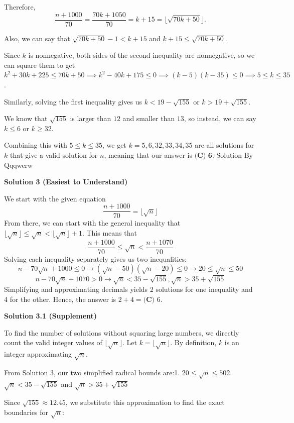 \begin{enumerate}
 Therefore, 
 \[\frac{n+1000}{70}=\frac{70k+1050}{70}=k+15=\lfloor\sqrt{70k+50}\rfloor.\]

 Also, we can say that $\sqrt{70k+50}-1 < k+15$ and $k+15\leq\sqrt{70k+50}.$

 Since $k$ is nonnegative, both sides of the second inequality are nonnegative, so we can square them to get $k^{2}+30k+225\leq70k+50\implies k^{2}-40k+175\leq 0\implies (k-5)(k-35)\leq0\implies 5\leq k\leq 35$.

 Similarly, solving the first inequality gives us $k < 19-\sqrt{155}$ or $k > 19+\sqrt{155}.$

 We know that $\sqrt{155}$ is larger than $12$ and smaller than $13$, so instead, we can say $k\leq 6$ or $k\geq 32$.

 Combining this with $5\leq k\leq 35$, we get $k=5,6,32,33,34,35$ are all solutions for $k$ that give a valid solution for $n$, meaning that our answer is $\boxed{\textbf{(C) 6}}$.-Solution By Qqqwerw

 



\textbf{Solution 3 (Easiest to Understand)}

We start with the given equation
 \[\dfrac{n+1000}{70} = \lfloor \sqrt{n} \rfloor\]From there, we can start with the general inequality that $\lfloor \sqrt{n} \rfloor \leq \sqrt{n} < \lfloor \sqrt{n} \rfloor + 1$. This means that
 \[\dfrac{n+1000}{70} \leq \sqrt{n} < \dfrac{n+1070}{70}\]Solving each inequality separately gives us two inequalities:
 \[n - 70\sqrt{n} +1000 \leq 0 \rightarrow (\sqrt{n}-50)(\sqrt{n}-20)\leq 0 \rightarrow 20\leq \sqrt{n} \leq 50\]
 \[n-70\sqrt{n}+1070 > 0 \rightarrow \sqrt{n} < 35-\sqrt{155} , \sqrt{n} > 35+\sqrt{155}\]Simplifying and approximating decimals yields 2 solutions for one inequality and 4 for the other. Hence, the answer is $2+4 = \boxed{\textbf{(C) } 6}$.

 



\textbf{Solution 3.1 (Supplement)}

To find the number of solutions without squaring large numbers, we directly count the valid integer values of $\lfloor \sqrt{n} \rfloor$. Let $k = \lfloor \sqrt{n} \rfloor$. By definition, $k$ is an integer approximating $\sqrt{n}$.

 From Solution 3, our two simplified radical bounds are:1. $20 \leq \sqrt{n} \leq 50$2. $\sqrt{n} < 35 - \sqrt{155}$ and $\sqrt{n} > 35 + \sqrt{155}$

 Since $\sqrt{155} \approx 12.45$, we substitute this approximation to find the exact boundaries for $\sqrt{n}$:


\end{enumerate}
